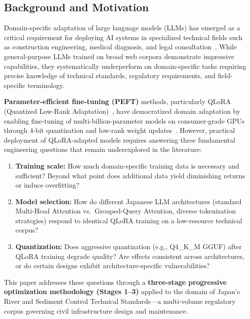 \documentclass[twocolumn]{article}
\begin{document}
\subsection{Background and Motivation}

Domain-specific adaptation of large language models (LLMs) has emerged as a critical
requirement for deploying AI systems in specialized technical fields such as construction
engineering, medical diagnosis, and legal consultation~\cite{zhao2023llmsurvey,singhal2023med}.
While general-purpose LLMs trained on broad web corpora demonstrate impressive capabilities,
they systematically underperform on domain-specific tasks requiring precise knowledge of
technical standards, regulatory requirements, and field-specific terminology.

\textbf{Parameter-efficient fine-tuning (PEFT)} methods, particularly QLoRA
(Quantized Low-Rank Adaptation)~\cite{dettmers2023qlora}, have democratized domain
adaptation by enabling fine-tuning of multi-billion-parameter models on
consumer-grade GPUs through 4-bit quantization and low-rank weight updates~\cite{hu2022lora}.
However, practical deployment of QLoRA-adapted models requires answering three fundamental
engineering questions that remain underexplored in the literature:

\begin{enumerate}
  \item \textbf{Training scale:} How much domain-specific training data is
        necessary and sufficient? Beyond what point does additional data yield diminishing
        returns or induce overfitting?
  \item \textbf{Model selection:} How do different Japanese LLM architectures 
        (standard Multi-Head Attention vs.\ Grouped-Query Attention, diverse tokenization 
        strategies) respond to identical QLoRA training on a low-resource technical corpus?
  \item \textbf{Quantization:} Does aggressive quantization (e.g., Q4\_K\_M GGUF) after 
        QLoRA training degrade quality? Are effects consistent across architectures, or do 
        certain designs exhibit architecture-specific vulnerabilities?
\end{enumerate}

This paper addresses these questions through a \textbf{three-stage progressive optimization
methodology (Stages 1--3)} applied to the domain of Japan's River and Sediment Control
Technical Standards---a multi-volume regulatory corpus governing civil infrastructure
design and maintenance.
\end{document}

